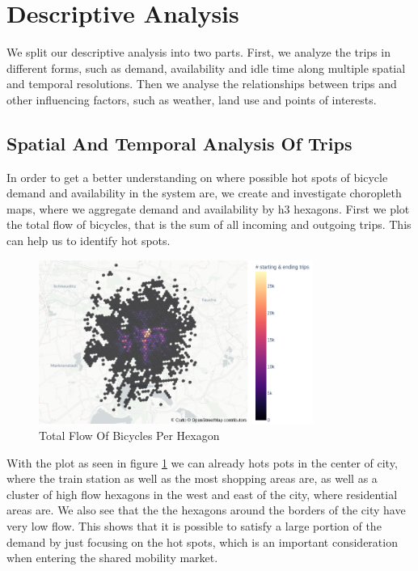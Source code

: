 \section{Descriptive Analysis}
\label{sec:descriptive_analysis}

We split our descriptive analysis into two parts.
First, we analyze the trips in different forms, such as demand, availability and
idle time along multiple spatial and temporal resolutions. Then we analyse the
relationships between trips and other influencing factors, such as weather,
land use and points of interests.


\subsection{Spatial And Temporal Analysis Of Trips}
\label{subsec:descriptive_analysis_spatial_temporal}

In order to get a better understanding on where possible hot spots of bicycle
demand and availability in the system are, we create and investigate choropleth maps,
where we aggregate demand and availability by h3 hexagons.
First we plot the total flow of bicycles, that is the sum of all incoming and
outgoing trips. This can help us to identify hot spots.

\begin{figure}[htb]
    \centering
    \includegraphics[width=0.8\textwidth]{Figures/descriptive_analysis/total_flow.png}
    \caption{Total Flow Of Bicycles Per Hexagon}
    \label{fig:descriptive_analysis_total_flow}
\end{figure}

With the plot as seen in figure \ref{fig:descriptive_analysis_total_flow} we
can already hots pots in the center of city, where the train station as well as
the most shopping areas are, as well as a cluster of high flow hexagons in the
west and east of the city, where residential areas are.
We also see that the the hexagons around the borders of the city have very low flow. 
This shows that it is possible to satisfy a large portion of the demand by just focusing on the hot spots, which is an important consideration when entering the shared mobility market.

